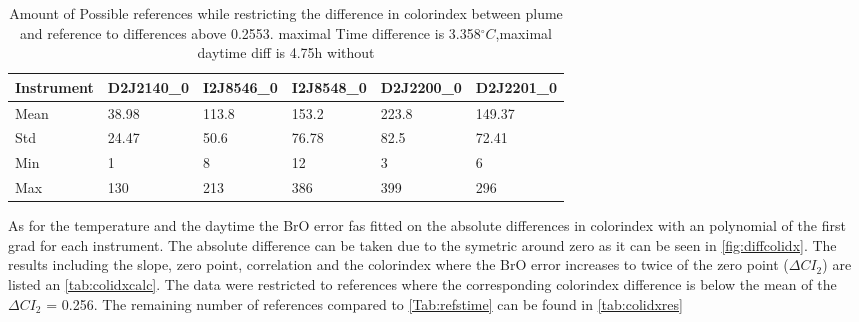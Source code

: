 \documentclass  [
  paper    = a4,
  BCOR     = 10mm,
  twoside,
  fontsize = 12pt,
  fleqn,
  toc      = bibnumbered,
  toc      = listofnumbered,
  numbers  = noendperiod,
  headings = normal,
  listof   = leveldown,
  version  = 3.03
]                                       {scrreprt}
\begin{document}
	\begin{table}
	\begin{tabular}{|p{2cm}|p{2cm}|p{2cm}|p{2cm}|p{2cm}|p{2cm}|}
		Instrument	&D2J2140\_0&I2J8546\_0& I2J8548\_0&D2J2200\_0&D2J2201\_0\\
		\toprule
		Mean&38.98&113.8&153.2&223.8&149.37\\
		\midrule
		Std&
		24.47&
		50.6&
		76.78&
		82.5&
		72.41\\
		\midrule
		Min&1&8&12&3 &6\\
		\midrule
		Max&130&213&386&399 &296\\
		\bottomrule
	\end{tabular}
	\caption{Amount of Possible references while restricting the difference in colorindex  between plume and reference to differences above 0.2553. maximal Time difference is 3.358$^{\circ}C$,maximal daytime diff is 4.75h without}
\end{table}	
As for the temperature and the daytime the BrO error fas fitted on the absolute differences in colorindex with an polynomial of the first grad for each instrument. The absolute difference can be taken due to the symetric around zero as it  can be seen in \cref{fig:diffcolidx}. The results including the slope, zero point, correlation and the colorindex where the BrO error increases to twice of the zero point ($\Delta CI_{2}$) are listed an \cref{tab:colidxcalc}.
The data were restricted to references where the corresponding colorindex difference is below the mean of the $\Delta CI_{2}$ = 0.256. The remaining number of references compared to \cref{Tab:refstime} can be found in \cref{tab:colidxres}
\end{document}
